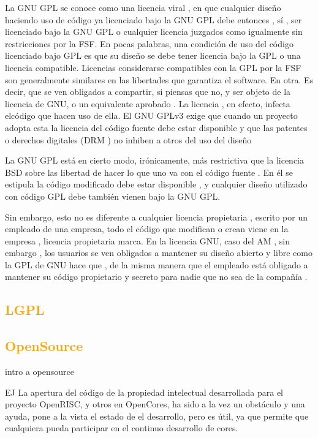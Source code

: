 \documentclass[a4paper,11pt]{article}
\begin{document}
La GNU GPL se conoce como una licencia viral , en que cualquier diseño haciendo uso de código ya licenciado bajo la GNU GPL debe entonces , sí , ser licenciado bajo la GNU GPL o cualquier licencia juzgados como igualmente sin restricciones por la FSF. En pocas palabras, una condición de uso del código licenciado bajo GPL es que su diseño se debe tener licencia bajo la GPL o una licencia compatible. Licencias considerarse compatibles con la GPL por la FSF son generalmente similares en las libertades que garantiza el software. En otra.
Es decir, que se ven obligados a compartir, si piensas que no, y ser objeto de la licencia de GNU, o un equivalente aprobado . La licencia , en efecto, infecta elcódigo que hacen uso de ella. El GNU GPLv3 exige que cuando un proyecto adopta esta la licencia del código fuente debe estar disponible y que las patentes o derechos digitales (DRM ) no inhiben a otros del uso del diseño

La GNU GPL está en cierto modo, irónicamente, más restrictiva que la licencia BSD
sobre las libertad de hacer lo que uno va con el código fuente . En él se estipula la
código modificado debe estar disponible , y cualquier diseño utilizado con código GPL debe
también vienen bajo la GNU GPL.

Sin embargo, esto no es diferente a cualquier licencia propietaria , escrito por un empleado de una empresa, todo el código que modifican o crean viene en la empresa , licencia propietaria marca. En la licencia GNU, caso del AM , sin embargo , los usuarios se ven obligados a mantener su diseño abierto y libre como la GPL de GNU hace que , de la misma manera que el empleado está obligado a mantener su código propietario y secreto para nadie que no sea de la compañía .
		\subsection{\textcolor{orange}{LGPL}}
		\subsection{\textcolor{orange}{OpenSource}}
intro a opensource

EJ
La apertura del código de la propiedad intelectual desarrollada para el proyecto OpenRISC, y otros en OpenCores, ha sido a la vez un obstáculo y una ayuda, pone a la vista el estado de el desarrollo, pero es útil, ya que permite que cualquiera pueda participar en el continuo desarrollo de cores. %
		
\end{document}
